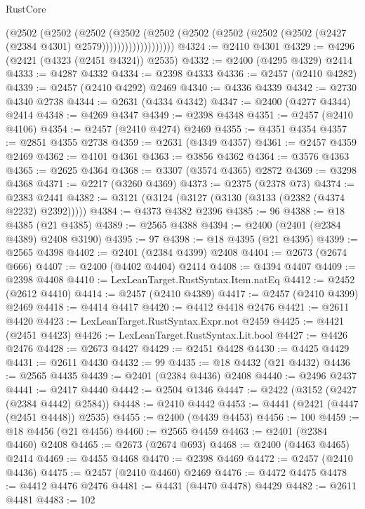 \begin{lexlean}{RustCore}
\begin{coremodule}
                      (@2502
                        (@2502
                          (@2502
                            (@2502
                              (@2502
                                (@2502
                                  (@2502 (@2502 (@2502 (@2427 (@2384 @4301) @2579)))))))))))))))))))
@4324 := @2410 @4301
@4329 := @4296 (@2421 (@4323 (@2451 @4324)) @2535)
@4332 := @2400 (@4295 @4329) @2414
@4333 := @4287 @4332
@4334 := @2398 @4333
@4336 := @2457 (@2410 @4282)
@4339 := @2457 (@2410 @4292) @2469
@4340 := @4336 @4339
@4342 := @2730 @4340 @2738
@4344 := @2631 (@4334 @4342)
@4347 := @2400 (@4277 @4344) @2414
@4348 := @4269 @4347
@4349 := @2398 @4348
@4351 := @2457 (@2410 @4106)
@4354 := @2457 (@2410 @4274) @2469
@4355 := @4351 @4354
@4357 := @2851 @4355 @2738
@4359 := @2631 (@4349 @4357)
@4361 := @2457 @4359 @2469
@4362 := @4101 @4361
@4363 := @3856 @4362
@4364 := @3576 @4363
@4365 := @2625 @4364
@4368 := @3307 (@3574 @4365) @2872
@4369 := @3298 @4368
@4371 := @2217 (@3260 @4369)
@4373 := @2375 (@2378 @73)
@4374 := @2383 @2441
@4382 := @3121 (@3124 (@3127 (@3130 (@3133 (@2382 (@4374 @2232) @2392)))))
@4384 := @4373 @4382 @2396
@4385 := 96
@4388 := @18 @4385 (@21 @4385)
@4389 := @2565 @4388
@4394 := @2400 (@2401 (@2384 @4389) @2408 @3190)
@4395 := 97
@4398 := @18 @4395 (@21 @4395)
@4399 := @2565 @4398
@4402 := @2401 (@2384 @4399) @2408
@4404 := @2673 (@2674 @666)
@4407 := @2400 (@4402 @4404) @2414
@4408 := @4394 @4407
@4409 := @2398 @4408
@4410 := LexLeanTarget.RustSyntax.Item.natEq
@4412 := @2452 (@2612 @4410)
@4414 := @2457 (@2410 @4389)
@4417 := @2457 (@2410 @4399) @2469
@4418 := @4414 @4417
@4420 := @4412 @4418 @2476
@4421 := @2611 @4420
@4423 := LexLeanTarget.RustSyntax.Expr.not @2459
@4425 := @4421 (@2451 @4423)
@4426 := LexLeanTarget.RustSyntax.Lit.bool
@4427 := @4426 @2476
@4428 := @2673 @4427
@4429 := @2451 @4428
@4430 := @4425 @4429
@4431 := @2611 @4430
@4432 := 99
@4435 := @18 @4432 (@21 @4432)
@4436 := @2565 @4435
@4439 := @2401 (@2384 @4436) @2408
@4440 := @2496 @2437
@4441 := @2417 @4440
@4442 := @2504 @1346
@4447 := @2422 (@3152 (@2427 (@2384 @4442) @2584))
@4448 := @2410 @4442
@4453 := @4441 (@2421 (@4447 (@2451 @4448)) @2535)
@4455 := @2400 (@4439 @4453)
@4456 := 100
@4459 := @18 @4456 (@21 @4456)
@4460 := @2565 @4459
@4463 := @2401 (@2384 @4460) @2408
@4465 := @2673 (@2674 @693)
@4468 := @2400 (@4463 @4465) @2414
@4469 := @4455 @4468
@4470 := @2398 @4469
@4472 := @2457 (@2410 @4436)
@4475 := @2457 (@2410 @4460) @2469
@4476 := @4472 @4475
@4478 := @4412 @4476 @2476
@4481 := @4431 (@4470 @4478) @4429
@4482 := @2611 @4481
@4483 := 102

\end{coremodule}
\end{lexlean}
